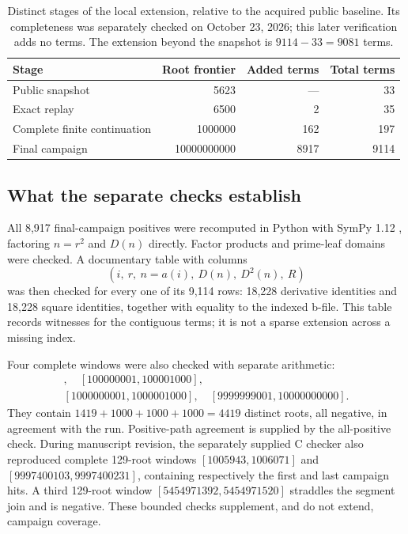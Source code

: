 \documentclass[11pt]{article}
\theoremstyle{definition}
\theoremstyle{remark}
\newcommand{\DD}{D^{2}}
\begin{document}
\begin{table}[htbp]
\centering
\caption{Distinct stages of the local extension, relative to the acquired
public baseline. Its completeness was separately checked on October 23,
2026; this later verification adds no terms. The extension beyond the
snapshot is $9114-33=9081$ terms.}\label{tab:stages}
\begin{tabular}{lrrr}
\toprule
Stage&Root frontier&Added terms&Total terms\\
\midrule
Public snapshot&5623&---&33\\
Exact replay&6500&2&35\\
Complete finite continuation&1000000&162&197\\
Final campaign&10000000000&8917&9114\\
\bottomrule
\end{tabular}
\end{table}

\subsection{What the separate checks establish}\label{sec:validation}
All 8,917 final-campaign positives were recomputed in Python with
SymPy 1.12 \cite{sympy}, factoring $n=r^{2}$ and $D(n)$ directly.
Factor products and prime-leaf domains were checked. A documentary
table with columns
\[
 (i,\ r,\ n=a(i),\ D(n),\ \DD(n),\ R)
\]
was then checked for every one of its 9,114 rows: 18,228 derivative
identities and 18,228 square identities, together with equality to the
indexed b-file. This table records witnesses for the contiguous terms;
it is not a sparse extension across a missing index.

Four complete windows were also checked with separate arithmetic:
\begin{gather*}
 [1000001,1001419],\quad[100000001,100001000],\\
 [1000000001,1000001000],\quad[9999999001,10000000000].
\end{gather*}
They contain $1419+1000+1000+1000=4419$ distinct roots, all negative,
in agreement with the run. Positive-path agreement is supplied by
the all-positive check. During manuscript revision, the separately
supplied C checker also reproduced complete 129-root windows
$[1005943,1006071]$ and $[9997400103,9997400231]$, containing
respectively the first and last campaign hits. A third 129-root window
$[5454971392,5454971520]$ straddles the segment join and is negative.
These bounded checks supplement, and do not extend, campaign coverage.
\end{document}
